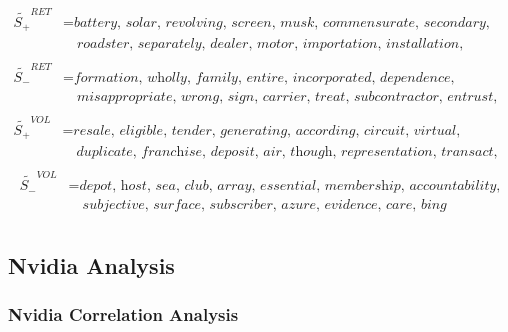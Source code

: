 \documentclass[logo,bsc,singlespacing,parskip]{infthesis}
\begin{document}
\begin{align*}
\tilde{S_{+}}^{RET} &= \textit{battery, solar, revolving, screen, musk, commensurate, secondary, } \\
               &\quad \textit{roadster, separately, dealer, motor, importation, installation, misstatement, convert} \\
\end{align*}
\begin{align*}
\tilde{S_{-}}^{RET} &= \textit{formation, wholly, family, entire, incorporated, dependence, nationwide, } \\
               &\quad \textit{misappropriate, wrong, sign, carrier, treat, subcontractor, entrust, remotely} \\
\end{align*}
\begin{align*}
\tilde{S_{+}}^{VOL} &= \textit{resale, eligible, tender, generating, according, circuit, virtual, } \\
               &\quad \textit{duplicate, franchise, deposit, air, though, representation, transact, attorney} \\
\end{align*}
\begin{align*}
\tilde{S_{-}}^{VOL} &= \textit{depot, host, sea, club, array, essential, membership, accountability,} \\
               &\quad \textit{subjective, surface, subscriber, azure, evidence, care, bing} \\
\end{align*}


\subsection{Nvidia Analysis}
\subsubsection{Nvidia Correlation Analysis}

\end{document}
